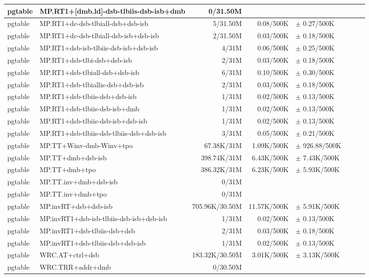 \begin{tabular}{l l  | r r l | r r l}
\hline
   pgtable&MP.RT1+[dmb.ld]-dsb-tlbiis-dsb-isb+dmb&0/31.50M&&&\\
\hline
   pgtable&MP.RT1+dc-dsb-tlbiall-dsb+dsb-isb&5/31.50M&0.08/500K&$\pm$ 0.27/500K&\\
\hline
   pgtable&MP.RT1+dc-dsb-tlbiall-dsb-isb+dsb-isb&2/31.50M&0.03/500K&$\pm$ 0.18/500K&\\
\hline
   pgtable&MP.RT1+dsb-isb-tlbiis-dsb-isb+dsb-isb&4/31M&0.06/500K&$\pm$ 0.25/500K&\\
\hline
   pgtable&MP.RT1+dsb-tlbi-dsb+dsb-isb&2/31M&0.03/500K&$\pm$ 0.18/500K&\\
\hline
   pgtable&MP.RT1+dsb-tlbiall-dsb+dsb-isb&6/31M&0.10/500K&$\pm$ 0.30/500K&\\
\hline
   pgtable&MP.RT1+dsb-tlbiallis-dsb+dsb-isb&2/31M&0.03/500K&$\pm$ 0.18/500K&\\
\hline
   pgtable&MP.RT1+dsb-tlbiis-dsb+dsb-isb&1/31M&0.02/500K&$\pm$ 0.13/500K&\\
\hline
   pgtable&MP.RT1+dsb-tlbiis-dsb-isb+dmb&1/31M&0.02/500K&$\pm$ 0.13/500K&\\
\hline
   pgtable&MP.RT1+dsb-tlbiis-dsb-isb+dsb-isb&1/31M&0.02/500K&$\pm$ 0.13/500K&\\
\hline
   pgtable&MP.RT1+dsb-tlbiis-dsb-tlbiis-dsb+dsb-isb&3/31M&0.05/500K&$\pm$ 0.21/500K&\\
\hline
   pgtable&MP.TT+Winv-dmb-Winv+tpo&67.38K/31M&1.09K/500K&$\pm$ 926.88/500K&\\
\hline
   pgtable&MP.TT+dmb+dsb-isb&398.74K/31M&6.43K/500K&$\pm$ 7.43K/500K&\\
\hline
   pgtable&MP.TT+dmb+tpo&386.32K/31M&6.23K/500K&$\pm$ 5.93K/500K&\\
\hline
   pgtable&MP.TT.inv+dmb+dsb-isb&0/31M&&&\\
\hline
   pgtable&MP.TT.inv+dmb+tpo&0/31M&&&\\
\hline
   pgtable&MP.invRT+dsb+dsb-isb&705.96K/30.50M&11.57K/500K&$\pm$ 5.91K/500K&\\
\hline
   pgtable&MP.invRT1+dsb-isb-tlbiis-dsb-isb+dsb-isb&1/31M&0.02/500K&$\pm$ 0.13/500K&\\
\hline
   pgtable&MP.invRT1+dsb-tlbiis-dsb+dsb&2/31M&0.03/500K&$\pm$ 0.18/500K&\\
\hline
   pgtable&MP.invRT1+dsb-tlbiis-dsb+dsb-isb&1/31M&0.02/500K&$\pm$ 0.13/500K&\\
\hline
   pgtable&WRC.AT+ctrl+dsb&183.32K/30.50M&3.01K/500K&$\pm$ 3.13K/500K&\\
\hline
   pgtable&WRC.TRR+addr+dmb&0/30.50M&&&\\

\end{tabular}
